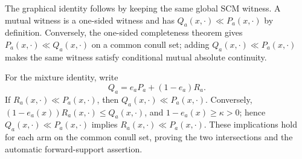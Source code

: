 The graphical identity follows by keeping the same global SCM witness.  A mutual witness is a one-sided witness and has \(Q_a(x,\cdot)\ll P_a(x,\cdot)\) by definition.  Conversely, the one-sided completeness theorem gives \(P_a(x,\cdot)\ll Q_a(x,\cdot)\) on a common conull set; adding \(Q_a(x,\cdot)\ll P_a(x,\cdot)\) makes the same witness satisfy conditional mutual absolute continuity.

For the mixture identity, write
\[
 Q_a=e_aP_a+(1-e_a)R_a.
\]
If \(R_a(x,\cdot)\ll P_a(x,\cdot)\), then \(Q_a(x,\cdot)\ll P_a(x,\cdot)\).  Conversely, \((1-e_a(x))R_a(x,\cdot)\le Q_a(x,\cdot)\), and \(1-e_a(x)\ge\kappa>0\); hence \(Q_a(x,\cdot)\ll P_a(x,\cdot)\) implies \(R_a(x,\cdot)\ll P_a(x,\cdot)\).  These implications hold for each arm on the common conull set, proving the two intersections and the automatic forward-support assertion.